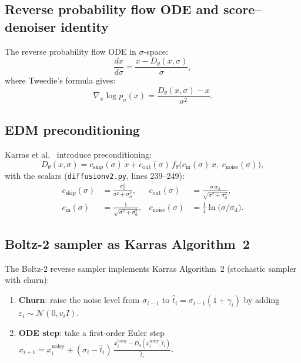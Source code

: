 \documentclass[11pt,a4paper]{article}
\newcommand{\N}{\mathcal{N}}
\newcommand{\xnoisy}{x^{\mathrm{noisy}}}
\newcommand{\that}{\hat{t}}
\newcommand{\Dtheta}{D_\theta}
\newcommand{\ftheta}{f_\theta}
\newcommand{\cskip}{c_{\mathrm{skip}}}
\newcommand{\cout}{c_{\mathrm{out}}}
\newcommand{\cin}{c_{\mathrm{in}}}
\newcommand{\cnoise}{c_{\mathrm{noise}}}
\newcommand{\sigmaD}{\sigma_{\mathrm{d}}}
\begin{document}
\subsection{Reverse probability flow ODE and score--denoiser identity}

The reverse probability flow ODE in $\sigma$-space:
\begin{equation}
  \frac{dx}{d\sigma} = \frac{x - \Dtheta(x, \sigma)}{\sigma},
  \label{eq:reverse-ode}
\end{equation}
where Tweedie's formula gives:
\begin{equation}
  \nabla_x \log p_\sigma(x)
  = \frac{\Dtheta(x, \sigma) - x}{\sigma^2}.
  \label{eq:score-denoiser}
\end{equation}

\subsection{EDM preconditioning}
\label{sec:edm-precond}

Karras et al.~\cite{karras2022edm} introduce preconditioning:
\begin{equation}
  \Dtheta(x, \sigma)
  = \cskip(\sigma)\,x
  + \cout(\sigma)\,\ftheta\!\bigl(\cin(\sigma)\,x,\; \cnoise(\sigma)\bigr),
  \label{eq:edm-precond}
\end{equation}
with the scalars (\texttt{diffusionv2.py}, lines 239--249):
\begin{align}
  \cskip(\sigma) &= \frac{\sigmaD^2}{\sigma^2 + \sigmaD^2},
  &
  \cout(\sigma)  &= \frac{\sigma\,\sigmaD}{\sqrt{\sigma^2 + \sigmaD^2}},
  \\
  \cin(\sigma)   &= \frac{1}{\sqrt{\sigma^2 + \sigmaD^2}},
  &
  \cnoise(\sigma)&= \tfrac{1}{4}\ln\!\bigl(\sigma/\sigmaD\bigr).
\end{align}

\subsection{Boltz-2 sampler as Karras Algorithm~2}
\label{sec:karras-alg2}

The Boltz-2 reverse sampler implements Karras Algorithm~2 (stochastic
sampler with churn):
\begin{enumerate}
  \item \textbf{Churn}: raise the noise level from $\sigma_{i-1}$ to
        $\that_i = \sigma_{i-1}(1+\gamma_i)$ by adding
        $\varepsilon_i \sim \N(0, v_i I)$.
  \item \textbf{ODE step}: take a first-order Euler step
        $x_{i+1} = \xnoisy_i + (\sigma_i - \that_i)\,\frac{\xnoisy_i - \Dtheta(\xnoisy_i, \that_i)}{\that_i}$.
\end{enumerate}
\end{document}
